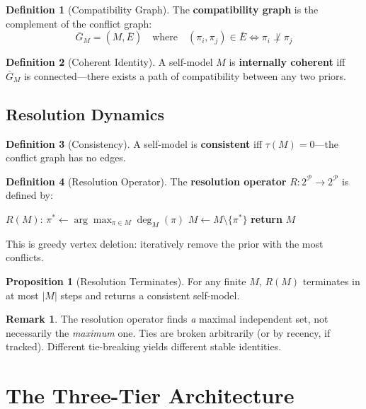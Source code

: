 \documentclass[12pt,a4paper]{article}
\theoremstyle{definition}
\newtheorem{definition}{Definition}[section]
\newtheorem{proposition}{Proposition}[section]
\newtheorem{remark}{Remark}[section]
\begin{document}
\begin{definition}[Compatibility Graph]
The \textbf{compatibility graph} is the complement of the conflict graph:
\[ \bar{G}_M = (M, \bar{E}) \quad \text{where} \quad (\pi_i, \pi_j) \in \bar{E} \iff \pi_i \not\perp \pi_j \]
\end{definition}

\begin{definition}[Coherent Identity]
A self-model $M$ is \textbf{internally coherent} iff $\bar{G}_M$ is connected---there exists a path of compatibility between any two priors.
\end{definition}

\subsection{Resolution Dynamics}

\begin{definition}[Consistency]
A self-model is \textbf{consistent} iff $\tau(M) = 0$---the conflict graph has no edges.
\end{definition}

\begin{definition}[Resolution Operator]
The \textbf{resolution operator} $R: 2^{\mathcal{P}} \to 2^{\mathcal{P}}$ is defined by:
\begin{algorithmic}
\STATE $R(M)$:
    \STATE $\pi^* \gets \arg\max_{\pi \in M} \deg_M(\pi)$
    \STATE $M \gets M \setminus \{\pi^*\}$
\ENDWHILE
\STATE \textbf{return} $M$
\end{algorithmic}
This is greedy vertex deletion: iteratively remove the prior with the most conflicts.
\end{definition}

\begin{proposition}[Resolution Terminates]
For any finite $M$, $R(M)$ terminates in at most $|M|$ steps and returns a consistent self-model.
\end{proposition}

\begin{remark}
The resolution operator finds \textit{a} maximal independent set, not necessarily the \textit{maximum} one. Ties are broken arbitrarily (or by recency, if tracked). Different tie-breaking yields different stable identities.
\end{remark}

\section{The Three-Tier Architecture}
\end{document}
